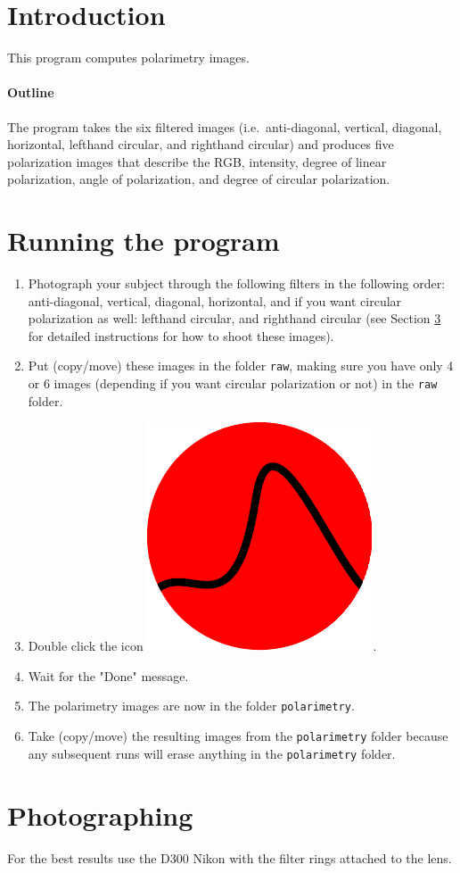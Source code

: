 \documentclass[12pt]{article}
\begin{document}
\maketitle

\section{Introduction}
This program computes polarimetry images.

\paragraph{Outline}
The program takes the six filtered images (i.e.\ anti-diagonal, vertical, diagonal, horizontal, lefthand circular, and righthand circular) and produces five polarization images that describe the RGB, intensity, degree of linear polarization, angle of polarization, and degree of circular polarization. 

\section{Running the program}
\begin{enumerate}
	\item Photograph your subject through the following filters in the following order: anti-diagonal, vertical, diagonal, horizontal, and if you want circular polarization as well: lefthand circular, and righthand circular (see Section \ref{shooting} for detailed instructions for how to shoot these images). 
	\item Put (copy/move) these images in the folder \texttt{raw}, making sure you have only 4 or 6 images (depending if you want circular polarization or not) in the \texttt{raw} folder.
	\item Double click the icon \includegraphics[height=2ex]{icon}.
	\item Wait for the "Done" message.
	\item The polarimetry images are now in the folder \texttt{polarimetry}.
	\item Take (copy/move) the resulting images from the \texttt{polarimetry} folder because any subsequent runs will erase anything in the \texttt{polarimetry} folder.
\end{enumerate}

\section{Photographing}\label{shooting}
For the best results use the D300 Nikon with the filter rings attached to the lens. 
\end{document}

